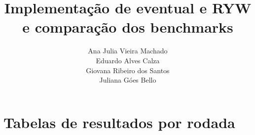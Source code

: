 \documentclass[12pt,a4paper]{article}
\title{Implementação de eventual e RYW\\e comparação dos benchmarks}
\author{Ana Julia Vieira Machado\\Eduardo Alves Calza\\Giovana Ribeiro dos Santos\\Juliana Góes Bello}
\date{}
\begin{document}
\maketitle

\clearpage
\section{Tabelas de resultados por rodada}

\end{document}
